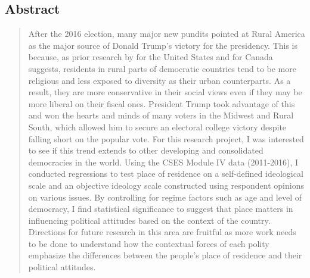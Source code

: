 \documentclass[12pt, titlepage]{article}
\title{\tb{Place of Residence and Political Attitudes in Democracies Worldwide }}
\author{Jennifer Lin}
\affil{New College of Florida}
\begin{document}
\begin{singlespace}
\maketitle
\end{singlespace}

\begin{center} %
\section*{Abstract} %
	
\begin{quote}
After the 2016 election, many major new pundits pointed at Rural America as the major source of Donald Trump’s victory for the presidency. This is because, as prior research by \cite{walsh_putting_2012} for the United States and \cite{walks_city-suburban_2005} for Canada suggests, residents in rural parts of democratic countries tend to be more religious and less exposed to diversity as their urban counterparts. As a result, they are more conservative in their social views even if they may be more liberal on their fiscal ones. President Trump took advantage of this and won the hearts and minds of many voters in the Midwest and Rural South, which allowed him to secure an electoral college victory despite falling short on the popular vote. For this research project, I was interested to see if this trend extends to other developing and consolidated democracies in the world. Using the CSES Module IV data (2011-2016), I conducted regressions to test place of residence on a self-defined ideological scale and an objective ideology scale constructed using respondent opinions on various issues. By controlling for regime factors such as age and level of democracy, I find statistical significance to suggest that place matters in influencing political attitudes based on the context of the country. Directions for future research in this area are fruitful as more work needs to be done to understand how the contextual forces of each polity emphasize the differences between the people's place of residence and their political attitudes.

\end{quote}
\end{center}

\clearpage

\tableofcontents
\clearpage
\end{document}
